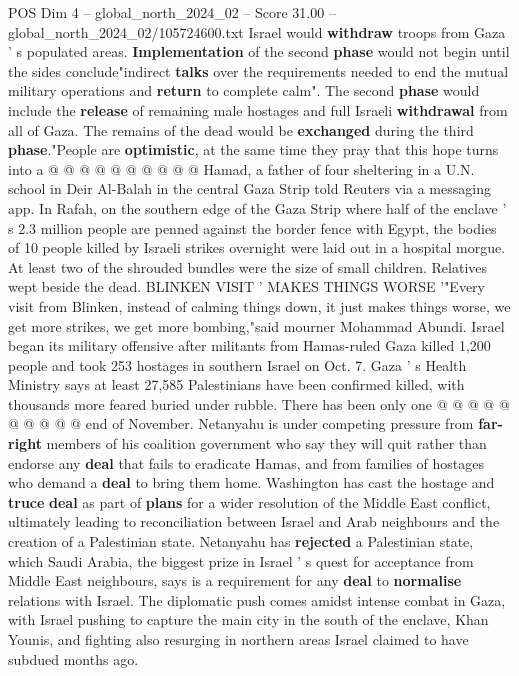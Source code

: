 \begin{textsample}{POS Dim 4 – global\_north\_2024\_02 – Score 31.00 – global\_north\_2024\_02/105724600.txt}
Israel would \textbf{withdraw} troops from Gaza ' s populated areas. \textbf{Implementation} of the second \textbf{phase} would not begin until the sides conclude"indirect \textbf{talks} over the requirements needed to end the mutual military operations and \textbf{return} to complete calm".
The second \textbf{phase} would include the \textbf{release} of remaining male hostages and full Israeli \textbf{withdrawal} from all of Gaza.
The remains of the dead would be \textbf{exchanged} during the third \textbf{phase}."People are \textbf{optimistic}, at the same time they pray that this hope turns into a @ @ @ @ @ @ @ @ @ @ Hamad, a father of four sheltering in a U.N. school in Deir Al-Balah in the central Gaza Strip told Reuters via a messaging app.
In Rafah, on the southern edge of the Gaza Strip where half of the enclave ' s 2.3 million people are penned against the border fence with Egypt, the bodies of 10 people killed by Israeli strikes overnight were laid out in a hospital morgue.
At least two of the shrouded bundles were the size of small children.
Relatives wept beside the dead.
BLINKEN VISIT ' MAKES THINGS WORSE '"Every visit from Blinken, instead of calming things down, it just makes things worse, we get more strikes, we get more bombing,"said mourner Mohammad Abundi.
Israel began its military offensive after militants from Hamas-ruled Gaza killed 1,200 people and took 253 hostages in southern Israel on Oct. 7.
Gaza ' s Health Ministry says at least 27,585 Palestinians have been confirmed killed, with thousands more feared buried under rubble.
There has been only one @ @ @ @ @ @ @ @ @ @ end of November.
Netanyahu is under competing pressure from \textbf{far-right} members of his coalition government who say they will quit rather than endorse any \textbf{deal} that fails to eradicate Hamas, and from families of hostages who demand a \textbf{deal} to bring them home.
Washington has cast the hostage and \textbf{truce} \textbf{deal} as part of \textbf{plans} for a wider resolution of the Middle East conflict, ultimately leading to reconciliation between Israel and Arab neighbours and the creation of a Palestinian state.
Netanyahu has \textbf{rejected} a Palestinian state, which Saudi Arabia, the biggest prize in Israel ' s quest for acceptance from Middle East neighbours, says is a requirement for any \textbf{deal} to \textbf{normalise} relations with Israel.
The diplomatic push comes amidst intense combat in Gaza, with Israel pushing to capture the main city in the south of the enclave, Khan Younis, and fighting also resurging in northern areas Israel claimed to have subdued months ago.

\end{textsample}
